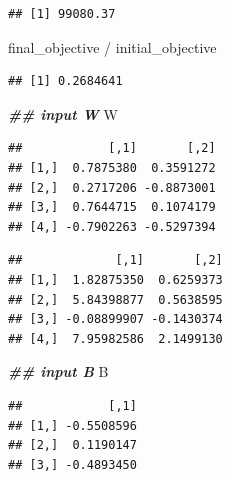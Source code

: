 \documentclass[
]{book}
\newenvironment{Shaded}{\begin{snugshade}}{\end{snugshade}}
\newcommand{\DocumentationTok}[1]{\textcolor[rgb]{0.56,0.35,0.01}{\textbf{\textit{#1}}}}
\newcommand{\NormalTok}[1]{#1}
\newcommand{\SpecialCharTok}[1]{\textcolor[rgb]{0.00,0.00,0.00}{#1}}
\begin{document}
\begin{verbatim}
## [1] 99080.37
\end{verbatim}

\begin{Shaded}
\begin{Highlighting}[]
\NormalTok{final\_objective }\SpecialCharTok{/}\NormalTok{ initial\_objective}
\end{Highlighting}
\end{Shaded}

\begin{verbatim}
## [1] 0.2684641
\end{verbatim}

\begin{Shaded}
\begin{Highlighting}[]
\DocumentationTok{\#\# input W}
\NormalTok{W}
\end{Highlighting}
\end{Shaded}

\begin{verbatim}
##            [,1]       [,2]
## [1,]  0.7875380  0.3591272
## [2,]  0.2717206 -0.8873001
## [3,]  0.7644715  0.1074179
## [4,] -0.7902263 -0.5297394
\end{verbatim}

\begin{Shaded}
\end{Shaded}

\begin{verbatim}
##             [,1]       [,2]
## [1,]  1.82875350  0.6259373
## [2,]  5.84398877  0.5638595
## [3,] -0.08899907 -0.1430374
## [4,]  7.95982586  2.1499130
\end{verbatim}

\begin{Shaded}
\begin{Highlighting}[]
\DocumentationTok{\#\# input B}
\NormalTok{B}
\end{Highlighting}
\end{Shaded}

\begin{verbatim}
##            [,1]
## [1,] -0.5508596
## [2,]  0.1190147
## [3,] -0.4893450
\end{verbatim}

\begin{Shaded}
\end{Shaded}
\end{document}
